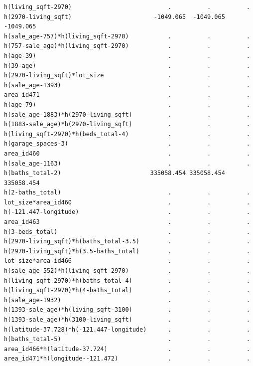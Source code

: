 \documentclass[
]{article}
\begin{document}
\begin{verbatim}
h(living_sqft-2970)                           .          .          .    
h(2970-living_sqft)                       -1049.065  -1049.065  -1049.065
h(sale_age-757)*h(living_sqft-2970)           .          .          .    
h(757-sale_age)*h(living_sqft-2970)           .          .          .    
h(age-39)                                     .          .          .    
h(39-age)                                     .          .          .    
h(2970-living_sqft)*lot_size                  .          .          .    
h(sale_age-1393)                              .          .          .    
area_id471                                    .          .          .    
h(age-79)                                     .          .          .    
h(sale_age-1883)*h(2970-living_sqft)          .          .          .    
h(1883-sale_age)*h(2970-living_sqft)          .          .          .    
h(living_sqft-2970)*h(beds_total-4)           .          .          .    
h(garage_spaces-3)                            .          .          .    
area_id460                                    .          .          .    
h(sale_age-1163)                              .          .          .    
h(baths_total-2)                         335058.454 335058.454 335058.454
h(2-baths_total)                              .          .          .    
lot_size*area_id460                           .          .          .    
h(-121.447-longitude)                         .          .          .    
area_id463                                    .          .          .    
h(3-beds_total)                               .          .          .    
h(2970-living_sqft)*h(baths_total-3.5)        .          .          .    
h(2970-living_sqft)*h(3.5-baths_total)        .          .          .    
lot_size*area_id466                           .          .          .    
h(sale_age-552)*h(living_sqft-2970)           .          .          .    
h(living_sqft-2970)*h(baths_total-4)          .          .          .    
h(living_sqft-2970)*h(4-baths_total)          .          .          .    
h(sale_age-1932)                              .          .          .    
h(1393-sale_age)*h(living_sqft-3100)          .          .          .    
h(1393-sale_age)*h(3100-living_sqft)          .          .          .    
h(latitude-37.728)*h(-121.447-longitude)      .          .          .    
h(baths_total-5)                              .          .          .    
area_id466*h(latitude-37.724)                 .          .          .    
area_id471*h(longitude--121.472)              .          .          .    
                                                                               

\end{verbatim}
\end{document}
